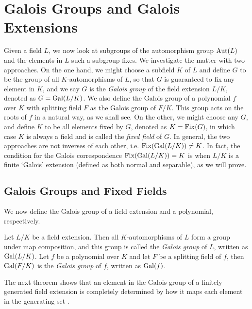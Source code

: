 \section{Galois Groups and Galois Extensions} \label{sec:galois-extensions}

Given a field $L$, we now look at subgroups of the automorphism group $\operatorname{Aut}(L)$ and the elements in $L$ such a subgroup fixes. We investigate the matter with two approaches. On the one hand, we might choose a subfield $K$ of $L$ and define $G$ to be the group of all $K$-automorphisms of $L$, so that $G$ is guaranteed to fix any element in $K$, and we say $G$ is the \textit{Galois group} of the field extension $L/K$, denoted as $G = \operatorname{Gal}(L/K)$. We also define the Galois group of a polynomial $f$ over $K$ with splitting field $F$ as the Galois group of $F / K$. This group acts on the roots of $f$ in a natural way, as we shall see. On the other, we might choose any $G$, and define $K$ to be all elements fixed by $G$, denoted as $K = \operatorname{Fix}(G)$, in which case $K$ is always a field and is called the \textit{fixed field} of $G$. In general, the two approaches are not inverses of each other, i.e. $\operatorname{Fix}(\operatorname{Gal}(L/K)) \neq K$. In fact, the condition for the Galois correspondence $\operatorname{Fix}(\operatorname{Gal}(L/K)) = K$ is when $L/K$ is a finite `Galois' extension (defined as both normal and separable), as we will prove. 


\subsection{Galois Groups and Fixed Fields}

We now define the Galois group of a field extension and a polynomial, respectively.
\begin{definition}
    Let $L/K$ be a field extension. Then all $K$-automorphisms of $L$ form a group under map composition, and this group is called the \textit{Galois group} of $L$, written as \(\operatorname{Gal}(L/K)\).
	Let $f$ be a polynomial over $K$ and let $F$ be a splitting field of $f$, then $\operatorname{Gal}(F/K)$ is the \textit{Galois group} of $f$, written as \(\operatorname{Gal}(f)\).
	
\end{definition}

The next theorem shows that an element in the Galois group of a finitely generated field extension is completely determined by how it maps each element in the generating set \cite[p.~16]{morandi_field_1996}. 

